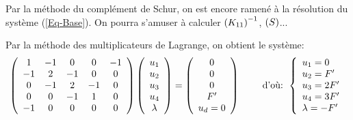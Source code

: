 \medskip
Par la méthode du complément de Schur, on est encore ramené à la résolution du système (\ref{Eq-Base}).
On pourra s'amuser à calculer $\left( K_{11}\right)^{-1}$, $\left( S\right)$...

\medskip
Par la méthode des multiplicateurs de Lagrange, on obtient le système:
\begin{equation}
\left( \begin{array}{ccccc} 1 & -1 & 0 & 0 & -1 \\ -1 & 2 & -1 & 0 & 0 \\ 0 & -1 & 2 & -1 & 0\\ 0&0&-1&1& 0 \\ -1&0&0&0&0
\end{array}\right)
\left( \begin{array}{c} u_1\\u_2\\u_3\\u_4\\ \lambda \end{array}\right)
=
\left( \begin{array}{c} 0\\0\\0\\F' \\ u_d=0\end{array}\right)
\qquad \text{ d'où: } 
\left\{\begin{array}{l} u_1=0 \\ u_2=F' \\ u_3=2F' \\ u_4=3F' \\ \lambda = -F' \end{array}\right.
\end{equation}


